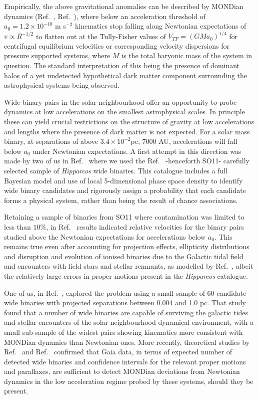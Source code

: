 \documentclass{ws-ijmpd}
\begin{document}
Empirically, the above gravitational anomalies can be described by MONDian dynamics (Ref.~, Ref.~),
where below an acceleration threshold of $a_{0}=1.2 \times 10^{-10}$ { m s$^{-2}$} kinematics stop falling along Newtonian expectations
of $v\propto R^{-1/2}$ to flatten out at the { Tully-Fisher} values of $V_{TF}=(G M a_{0})^{1/4}$ for centrifugal equilibrium velocities
or corresponding velocity dispersions for pressure supported systems, where $M$ is the total baryonic mass of the system in question.
The standard interpretation of this being the presence of dominant halos of a yet undetected hypothetical dark matter component
surrounding the astrophysical systems being observed.

Wide binary pairs in the solar neighbourhood offer an opportunity to probe dynamics at low accelerations on the smallest
astrophysical scales. In principle these can yield crucial restrictions on the structure of gravity at low accelerations and lengths
where the presence of dark matter is not expected. For a solar mass binary, at separations of above $3.4\times 10^{-2}$pc,
$7000$ AU, accelerations will fall below $a_{0}$ under Newtonian expectations. A first attempt in this direction was made by
two of us in Ref.~ where we used the Ref.~ -henceforth SO11- carefully selected sample of
{\it Hipparcos} wide binaries. This catalogue includes a full Bayesian model and use of local 5-dimensional phase space
density to identify wide binary candidates and rigorously assign a probability that each candidate forms a physical system,
rather than being the result of chance associations.


Retaining a sample of binaries from SO11 { where} contamination was limited to less than $10\%$,
in  Ref.~ results indicated relative velocities for the binary pairs studied above the Newtonian
expectations for accelerations below $a_{0}$. This remains true even after accounting for projection effects, ellipticity distributions
and disruption and evolution of ionised binaries due to the Galactic tidal field and encounters with field stars and stellar remnants,
as modelled by  Ref.~, albeit the relatively large errors in proper motions present in the {\it Hipparcos} catalogue.


One of us, in  Ref.~, explored the problem using a small sample of 60 candidate wide binaries with projected
separations between 0.004 and 1.0 pc. That study found that a number of wide binaries are capable of surviving the galactic tides and
stellar encounters of the solar neighbourhood dynamical environment, with a small sub-sample of the widest pairs showing kinematics
more consistent with MONDian dynamics than Newtonian ones. More recently, theoretical studies by Ref.~
and Ref.~ confirmed that Gaia data, in terms of expected number of detected wide binaries and confidence
intervals for the relevant proper motions and parallaxes, are sufficient to detect MONDian deviations from Newtonian
dynamics in the low acceleration regime probed by these systems, should they be present.
\end{document}
